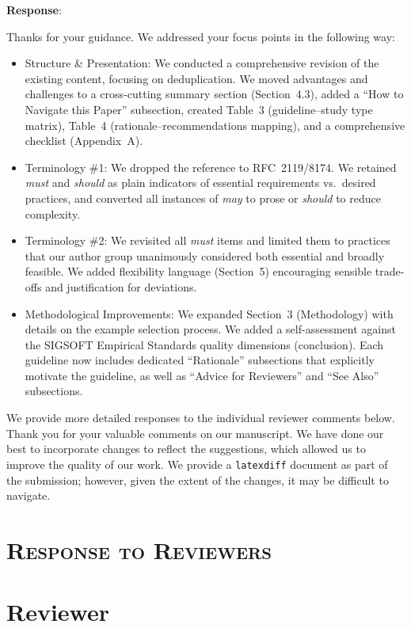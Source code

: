 \documentclass[11pt]{article}
\makeatletter
\newcounter{reviewer}
\newcounter{comment}[reviewer]
\newcommand{\review}{%
  \stepcounter{reviewer}%
  \section*{Reviewer \thereviewer}%
  \vspace{-0.75\baselineskip}%
}
\newenvironment{response}
{%
  \needspace{6\baselineskip}%
  \par\medskip\noindent\textbf{Response}:\\%
  \phantomsection%
  \begingroup
    \edef\@tempa{response:\thereviewer.\arabic{comment}}%
    \label{\@tempa}%
  \endgroup
}
{%
  \medskip\par
}
\makeatother
\begin{document}
\begin{response}
Thanks for your guidance. We addressed your focus points in the following way:

\begin{itemize}
    \item Structure \& Presentation: We conducted a comprehensive revision of the existing content, focusing on deduplication. We moved advantages and challenges to a cross-cutting summary section (Section~4.3), added a ``How to Navigate this Paper'' subsection, created Table~3 (guideline--study type matrix), Table~4 (rationale--recommendations mapping), and a comprehensive checklist (Appendix~A).
    \item Terminology \#1: We dropped the reference to RFC~2119/8174. We retained \emph{must} and \emph{should} as plain indicators of essential requirements vs.\ desired practices, and converted all instances of \emph{may} to prose or \emph{should} to reduce complexity.
    \item Terminology \#2: We revisited all \emph{must} items and limited them to practices that our author group unanimously considered both essential and broadly feasible. We added flexibility language (Section~5) encouraging sensible trade-offs and justification for deviations.
    \item Methodological Improvements: We expanded Section~3 (Methodology) with details on the example selection process. We added a self-assessment against the SIGSOFT Empirical Standards quality dimensions (conclusion). Each guideline now includes dedicated ``Rationale'' subsections that explicitly motivate the guideline, as well as ``Advice for Reviewers'' and ``See Also'' subsections.
\end{itemize}

We provide more detailed responses to the individual reviewer comments below.
Thank you for your valuable comments on our manuscript.
We have done our best to incorporate changes to reflect the suggestions, which allowed us to improve the quality of our work.
We provide a \texttt{latexdiff} document as part of the submission; however, given the extent of the changes, it may be difficult to navigate.
\end{response}


\section*{\textsc{Response to Reviewers}}

\review
\end{document}

